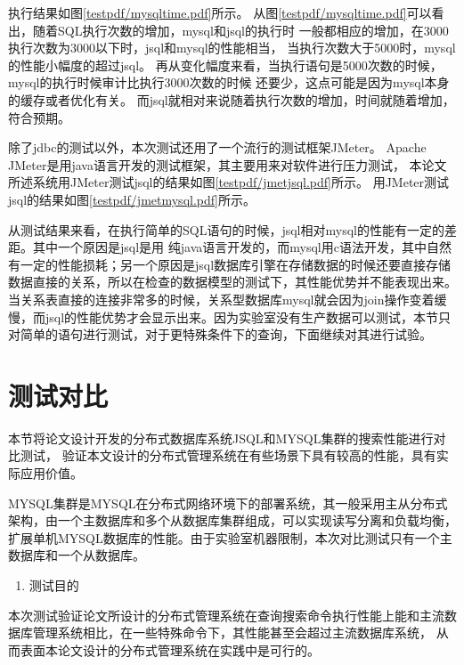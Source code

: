 

执行结果如图\ref{testpdf/mysqltime.pdf}所示。
从图\ref{testpdf/mysqltime.pdf}可以看出，随着SQL执行次数的增加，mysql和jsql的执行时
一般都相应的增加，在3000执行次数为3000以下时，jsql和mysql的性能相当，
当执行次数大于5000时，mysql的性能小幅度的超过jsql。
再从变化幅度来看，当执行语句是5000次数的时候，mysql的执行时候审计比执行3000次数的时候
还要少，这点可能是因为mysql本身的缓存或者优化有关。
而jsql就相对来说随着执行次数的增加，时间就随着增加，符合预期。

除了jdbc的测试以外，本次测试还用了一个流行的测试框架JMeter。
Apache JMeter是用java语言开发的测试框架，其主要用来对软件进行压力测试，
   本论文所述系统用JMeter测试jsql的结果如图\ref{testpdf/jmetjsql.pdf}所示。
    用JMeter测试jsql的结果如图\ref{testpdf/jmetmysql.pdf}所示。
   
   从测试结果来看，在执行简单的SQL语句的时候，jsql相对mysql的性能有一定的差距。其中一个原因是jsql是用
   纯java语言开发的，而mysql用c语法开发，其中自然有一定的性能损耗；另一个原因是jsql数据库引擎在存储数据的时候还要直接存储数据直接的关系，所以在检查的数据模型的测试下，其性能优势并不能表现出来。当关系表直接的连接非常多的时候，关系型数据库mysql就会因为join操作变着缓慢，而jsql的性能优势才会显示出来。因为实验室没有生产数据可以测试，本节只对简单的语句进行测试，对于更特殊条件下的查询，下面继续对其进行试验。
\section{测试对比}
本节将论文设计开发的分布式数据库系统JSQL和MYSQL集群的搜索性能进行对比测试，
验证本文设计的分布式管理系统在有些场景下具有较高的性能，具有实际应用价值。

MYSQL集群是MYSQL在分布式网络环境下的部署系统，其一般采用主从分布式架构，由一个主数据库和多个从数据库集群组成，可以实现读写分离和负载均衡，扩展单机MYSQL数据库的性能。由于实验室机器限制，本次对比测试只有一个主数据库和一个从数据库。

\begin{enumerate}
	\item 测试目的
\end{enumerate}


本次测试验证论文所设计的分布式管理系统在查询搜索命令执行性能上能和主流数据库管理系统相比，在一些特殊命令下，其性能甚至会超过主流数据库系统，
从而表面本论文设计的分布式管理系统在实践中是可行的。

